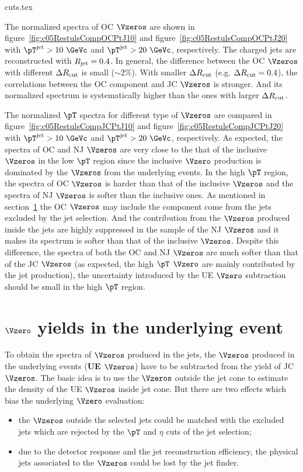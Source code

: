 cuts.tex


The normalized spectra of OC $\Vzeros$ are shown in
figure~\ref{fig:c05RestulsCompOCPtJ10} and
figure~\ref{fig:c05RestulsCompOCPtJ20} with $\pT^{\rm jet}>10~\GeVc$ and
$\pT^{\rm jet}>20~\GeVc$, respectively.
The charged jets are reconstructed with $R_{\rm jet}=0.4$.
In general, the difference between the OC $\Vzeros$ with
different $\Delta R_{\rm cut}$ is small ($\sim 2\%$).
With smaller $\Delta R_{\rm cut}$ (e.g. $\Delta R_{\rm cut}=0.4$),
the correlations between the OC component and JC $\Vzeros$ is stronger.
And its normalized spectrum is systematically higher
than the ones with  larger $\Delta R_{\rm cut}$.


The normalized $\pT$ spectra for different type of $\Vzeros$ are
compared in figure~\ref{fig:c05RestulsCompJCPtJ10} and
figure~\ref{fig:c05RestulsCompJCPtJ20}
with $\pT^{\rm jet}>10~\GeVc$ and $\pT^{\rm jet}>20~\GeVc$, respectively.
As expected, the spectra of OC and NJ $\Vzeros$ are very close to the that
of the inclusive $\Vzeros$ in the low $\pT$ region since the
inclusive $\Vzero$ production is dominated by the $\Vzeros$ from
the underlying events.
In the high $\pT$ region,
the spectra of OC $\Vzeros$ is harder than that of the inclusive $\Vzeros$
and the spectra of NJ $\Vzeros$ is softer than the inclusive ones.
As mentioned in section~\ref{sec:c05EstiV0sUE} the OC $\Vzeros$ may include
the component come from the jets excluded by the jet selection.
And the contribution from the $\Vzeros$ produced inside the jets are
highly suppressed in the sample of the NJ $\Vzeros$ and it makes its
spectrum is softer than that of the inclusive $\Vzeros$.
Despite this difference, the spectra of both the OC and NJ $\Vzeros$
are much softer than that of the JC $\Vzeros$ (as expected,
the high $\pT$ $\Vzero$ are mainly contributed by the jet production),
the uncertainty introduced by the UE $\Vzero$ subtraction should be
small in the high $\pT$ region.




\section{$\Vzero$ yields in the underlying event}
\label{sec:c05EstiV0sUE}

To obtain the spectra of $\Vzeros$ produced in the jets,
the $\Vzeros$ produced in the underlying events ({\bf UE $\mathbf\Vzeros$})
have to be subtracted from the yield of JC $\Vzeros$.
The basic idea is to use the $\Vzeros$ outside the jet cone to estimate
the density of the UE $\Vzeros$ inside jet cone.
But there are two effects which bias the underlying $\Vzero$ evaluation:
\begin{itemize}
\item the $\Vzeros$ outside the selected jets could be
      matched with the excluded jets which are rejected by
      the $\pT$ and $\eta$ cuts of the jet selection;
\item due to the detector response and the jet reconstruction efficiency,
      the physical jets associated to the $\Vzeros$ could be lost by the
      jet finder.
\end{itemize}

